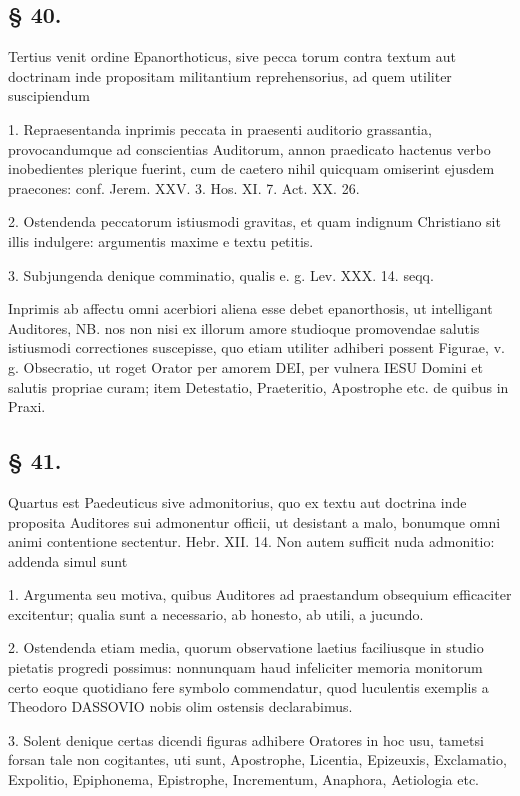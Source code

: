 \subsection*{§ 40.}

Tertius venit ordine Epanorthoticus, sive pecca%
torum contra textum aut doctrinam inde propositam militantium reprehensorius, ad quem utiliter suscipiendum

1. Repraesentanda inprimis peccata in praesenti auditorio grassantia, provocandumque ad conscientias Auditorum, annon praedicato hactenus verbo inobedientes plerique fuerint, cum de caetero nihil quicquam omiserint ejusdem praecones: conf. Jerem. XXV. 3. Hos. XI. 7. Act. XX. 26.

2. Ostendenda peccatorum istiusmodi gravitas, et quam indignum Christiano sit illis indulgere: argumentis maxime e textu petitis.

3. Subjungenda denique comminatio, qualis e. g. Lev. XXX. 14. seqq.

Inprimis ab affectu omni acerbiori aliena esse debet epanorthosis, ut intelligant Auditores, NB. nos non nisi ex illorum amore studioque promovendae salutis istiusmodi correctiones suscepisse, quo etiam utiliter adhiberi possent Figurae, v. g. Obsecratio, ut roget Orator per amorem DEI, per vulnera IESU Domini et salutis propriae curam; item Detestatio, Praeteritio, Apostrophe etc. de quibus in Praxi.

\subsection*{§ 41.}

Quartus est Paedeuticus sive admonitorius, quo ex textu aut doctrina inde proposita Auditores sui admonentur officii, ut desistant a malo, bonumque omni animi contentione sectentur. Hebr. XII. 14. Non autem sufficit nuda admonitio: addenda simul sunt

1. Argumenta seu motiva, quibus Auditores ad praestandum obsequium efficaciter excitentur; qualia sunt a necessario, ab honesto, ab utili, a jucundo.

2. Ostendenda etiam media, quorum observatione
laetius faciliusque in studio pietatis progredi possimus: nonnunquam haud infeliciter memoria monitorum certo eoque quotidiano fere symbolo commendatur, quod luculentis exemplis a Theodoro DASSOVIO nobis olim ostensis declarabimus.

3. Solent denique certas dicendi figuras adhibere Oratores in hoc usu, tametsi forsan tale non cogitantes, uti sunt, Apostrophe, Licentia, Epizeuxis, Exclamatio, Expolitio, Epiphonema, Epistrophe, Incrementum, Anaphora, Aetiologia etc.

